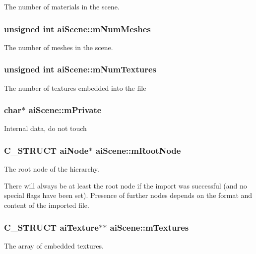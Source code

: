 \-The number of materials in the scene. \hypertarget{structaiScene_a1a6c1abca994c54381a28cc151e5fa4f}{
\subsubsection[{m\-Num\-Meshes}]{\setlength{\rightskip}{0pt plus 5cm}unsigned int {\bf ai\-Scene\-::m\-Num\-Meshes}}}\label{structaiScene_a1a6c1abca994c54381a28cc151e5fa4f}
\-The number of meshes in the scene. \hypertarget{structaiScene_a0d61a5439edd7223097b48aea57c47dd}{
\subsubsection[{m\-Num\-Textures}]{\setlength{\rightskip}{0pt plus 5cm}unsigned int {\bf ai\-Scene\-::m\-Num\-Textures}}}\label{structaiScene_a0d61a5439edd7223097b48aea57c47dd}
\-The number of textures embedded into the file \hypertarget{structaiScene_adc5fcf5c4ef86a45f721560d6c1a4923}{
\subsubsection[{m\-Private}]{\setlength{\rightskip}{0pt plus 5cm}char$\ast$ {\bf ai\-Scene\-::m\-Private}}}\label{structaiScene_adc5fcf5c4ef86a45f721560d6c1a4923}
\-Internal data, do not touch \hypertarget{structaiScene_ad0e9a7e68f2ed6b3120a7c19ef20307a}{
\subsubsection[{m\-Root\-Node}]{\setlength{\rightskip}{0pt plus 5cm}\-C\-\_\-\-S\-T\-R\-U\-C\-T {\bf ai\-Node}$\ast$ {\bf ai\-Scene\-::m\-Root\-Node}}}\label{structaiScene_ad0e9a7e68f2ed6b3120a7c19ef20307a}
\-The root node of the hierarchy.

\-There will always be at least the root node if the import was successful (and no special flags have been set). \-Presence of further nodes depends on the format and content of the imported file. \hypertarget{structaiScene_a0fd0d29fbc439e3715b4975ccb68d2d3}{
\subsubsection[{m\-Textures}]{\setlength{\rightskip}{0pt plus 5cm}\-C\-\_\-\-S\-T\-R\-U\-C\-T {\bf ai\-Texture}$\ast$$\ast$ {\bf ai\-Scene\-::m\-Textures}}}\label{structaiScene_a0fd0d29fbc439e3715b4975ccb68d2d3}
\-The array of embedded textures.

